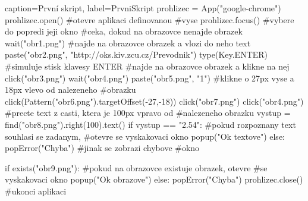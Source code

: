 \begin{lstpython}{caption={První skript}, label={PrvniSkript}}
prohlizec = App("google-chrome")
prohlizec.open()	#otevre aplikaci definovanou
				#vyse
prohlizec.focus()	#vybere do popredi jeji okno
#ceka, dokud na obrazovce nenajde obrazek
wait("obr1.png")
#najde na obrazovce obrazek a vlozi do neho text
paste("obr2.png", "http://oks.kiv.zcu.cz/Prevodnik")
type(Key.ENTER)	#simuluje stisk klavesy ENTER
#najde na obrazovce obrazek a klikne na nej
click("obr3.png")
wait("obr4.png")
paste("obr5.png", "1")
#klikne o 27px vyse a 18px vlevo od nalezeneho
#obrazku
click(Pattern("obr6.png").targetOffset(-27,-18))
click("obr7.png")
click("obr4.png")
#precte text z casti, ktera je 100px vpravo od
#nalezeneho obrazku
vystup = find("obr8.png").right(100).text()
if vystup == "2.54":
	#pokud rozpoznany text souhlasi se zadanym,
	#otevre se vyskakovaci okno
    popup("Ok textove")
else:
    popError("Chyba")    #jinak se zobrazi chybove
    			 #okno

if exists("obr9.png"):
	#pokud na obrazovce existuje obrazek, otevre
	#se vyskakovaci okno
    popup("Ok obrazove")
else:
    popError("Chyba")
prohlizec.close()    #ukonci aplikaci
\end{lstpython}